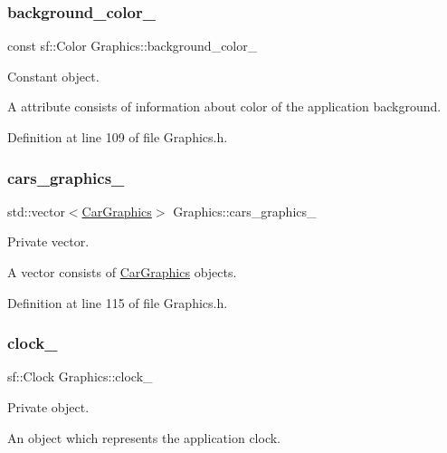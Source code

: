 \subsubsection{\texorpdfstring{background\+\_\+color\+\_\+}{background\_color\_}}
{\footnotesize\ttfamily const sf\+::\+Color Graphics\+::background\+\_\+color\+\_\+\hspace{0.3cm}{\ttfamily [private]}}



Constant object. 

A attribute consists of information about color of the application background. 

Definition at line 109 of file Graphics.\+h.

\mbox{\label{classGraphics_a8be356ffe3ee47f915027361b6ae34ab}} 
\subsubsection{\texorpdfstring{cars\+\_\+graphics\+\_\+}{cars\_graphics\_}}
{\footnotesize\ttfamily std\+::vector$<$\hyperlink{classCarGraphics}{Car\+Graphics}$>$ Graphics\+::cars\+\_\+graphics\+\_\+\hspace{0.3cm}{\ttfamily [private]}}



Private vector. 

A vector consists of \hyperlink{classCarGraphics}{Car\+Graphics} objects. 

Definition at line 115 of file Graphics.\+h.

\mbox{\label{classGraphics_ad9850d50fe5792666c8aea88f39ba99c}} 
\subsubsection{\texorpdfstring{clock\+\_\+}{clock\_}}
{\footnotesize\ttfamily sf\+::\+Clock Graphics\+::clock\+\_\+\hspace{0.3cm}{\ttfamily [private]}}



Private object. 

An object which represents the application clock. 

